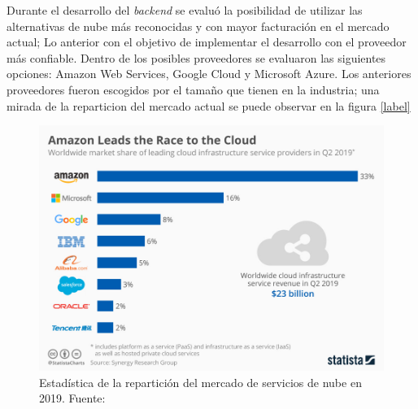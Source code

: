 
Durante el desarrollo del \textit{backend} se evaluó la posibilidad de utilizar las alternativas de nube más reconocidas y con mayor facturación en el mercado actual; Lo anterior con el objetivo de implementar el desarrollo con el proveedor más confiable. Dentro de los posibles proveedores se evaluaron las siguientes opciones: Amazon Web Services, Google Cloud y Microsoft Azure. Los anteriores proveedores fueron escogidos por el tamaño que tienen en la industria; una mirada de la reparticion del mercado actual se puede observar en la figura \ref{label}


\begin{figure}[htbp]
	\centerline{\includegraphics[width=12cm]{./figuras/market_share.jpg}}
	\caption{Estadística de la repartición del mercado de servicios de nube en 2019. Fuente: \cite{cloudstadistics}}
	\label{maket_stadistics}
\end{figure}

